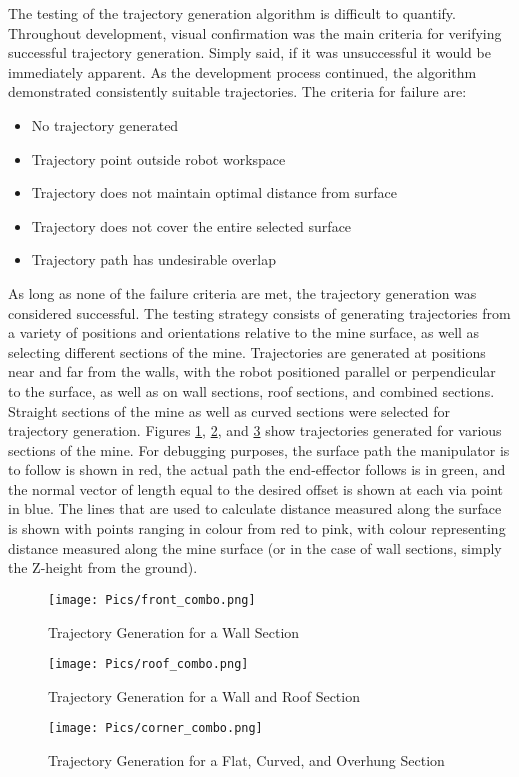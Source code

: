 The testing of the trajectory generation algorithm is difficult to quantify. Throughout development, visual confirmation was the main criteria for verifying successful trajectory generation. Simply said, if it was unsuccessful it would be immediately apparent. As the development process continued, the algorithm demonstrated consistently suitable trajectories. The criteria for failure are:

\begin{itemize}
    \item No trajectory generated
    \item Trajectory point outside robot workspace
    \item Trajectory does not maintain optimal distance from surface
    \item Trajectory does not cover the entire selected surface
    \item Trajectory path has undesirable overlap
\end{itemize}

As long as none of the failure criteria are met, the trajectory generation was considered successful. The testing strategy consists of generating trajectories from a variety of positions and orientations relative to the mine surface, as well as selecting different sections of the mine. Trajectories are generated at positions near and far from the walls, with the robot positioned parallel or perpendicular to the surface, as well as on wall sections, roof sections, and combined sections. Straight sections of the mine as well as curved sections were selected for trajectory generation. Figures \ref{fig:traj1}, \ref{fig:traj2}, and \ref{fig:traj3} show trajectories generated for various sections of the mine. For debugging purposes, the surface path the manipulator is to follow is shown in red, the actual path the end-effector follows is in green, and the normal vector of length equal to the desired offset is shown at each via point in blue. The lines that are used to calculate distance measured along the surface is shown with points ranging in colour from red to pink, with colour representing distance measured along the mine surface (or in the case of wall sections, simply the Z-height from the ground).\\

\begin{figure}
    \centering
    \texttt{[image: Pics/front\_combo.png]}
    \caption{Trajectory Generation for a Wall Section}
    \label{fig:traj1}
\end{figure}
\begin{figure}
    \centering
    \texttt{[image: Pics/roof\_combo.png]}
    \caption{Trajectory Generation for a Wall and Roof Section}
    \label{fig:traj2}
\end{figure}
\begin{figure}
    \centering
    \texttt{[image: Pics/corner\_combo.png]}
    \caption{Trajectory Generation for a Flat, Curved, and Overhung Section}
    \label{fig:traj3}
\end{figure}


